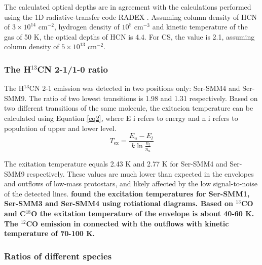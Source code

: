 \documentclass{aa}
\begin{document}
The calculated optical depths are in agreement with the calculations performed using the 
1D radiative-transfer code RADEX \citep{vdT07}. Assuming column density of 
HCN of $3 \times 10^{14}$ cm$^{-2}$, hydrogen density of $10^5$ cm$^{-3}$ and kinetic temperature of
the gas of 50 K, the optical depths of HCN is 4.4.
For CS, the value is 2.1, assuming column density of $5 \times 10^{13}$ cm$^{-2}$. 


\subsubsection{The H$^{13}$CN 2-1/1-0 ratio}
The H$^{13}$CN 2-1 emission was detected in two positions only: Ser-SMM4 and Ser-SMM9. The ratio of two lowest transitions is 1.98 and 1.31 respectively. Based on two different transitions of the same molecule, the exitacion temperature can be calculated using Equation \ref{eq2}, where E i refers to energy and n i refers to
population of upper and lower level.
\begin{equation} 
\label{eq2} 
T_{\mathrm{ex}} = \frac{E_u - E_l}{k \ln \frac{n_l}{n_u}} 
\end{equation}

The exitation temperature equals 2.43 K and 2.77 K for Ser-SMM4 and Ser-SMM9 respectively. These values are much lower than expected in the
envelopes and outflows of low-mass protostars, and likely affected by the low signal-to-noise of the detected lines. \textbf{\citealt{Yil13} found the excitation temperatures for Ser-SMM1, Ser-SMM3 and Ser-SMM4 using rotiational diagrams. Based on $^{13}$CO and C$^{18}$O the exitation temperature of the envelope is about 40-60 K. The $^{12}$CO emission in connected with the outflows with kinetic temperature of 70-100 K.}

\subsubsection{Ratios of different species}
 
\end{document}
